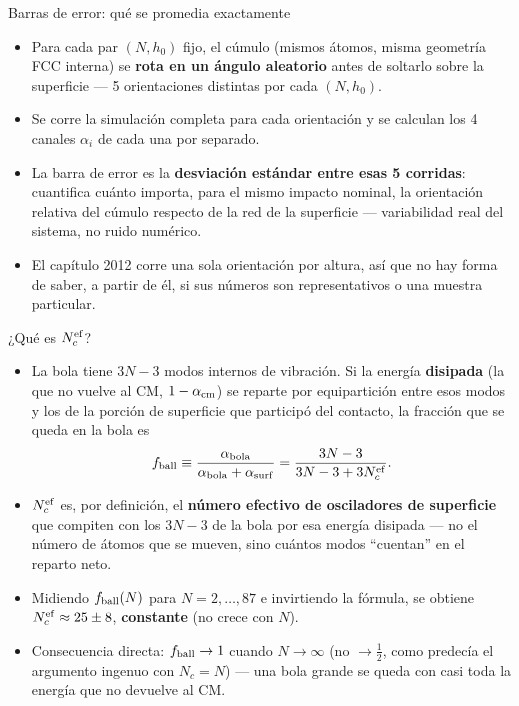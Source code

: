 \documentclass[11pt,aspectratio=169]{beamer}
\begin{document}
\begin{frame}{Barras de error: qué se promedia exactamente}
\begin{itemize}
    \item Para cada par $(N,h_0)$ fijo, el cúmulo (mismos átomos, misma
    geometría FCC interna) se \textbf{rota en un ángulo aleatorio} antes
    de soltarlo sobre la superficie --- 5 orientaciones distintas por
    cada $(N,h_0)$.
    \item Se corre la simulación completa para cada orientación y se
    calculan los 4 canales $\alpha_i$ de cada una por separado.
    \item La barra de error es la \textbf{desviación estándar entre esas
    5 corridas}: cuantifica cuánto importa, para el mismo impacto
    nominal, la orientación relativa del cúmulo respecto de la red de la
    superficie --- variabilidad real del sistema, no ruido numérico.
    \item El capítulo 2012 corre una sola orientación por altura, así que
    no hay forma de saber, a partir de él, si sus números son
    representativos o una muestra particular.
\end{itemize}
\end{frame}

\begin{frame}{¿Qué es \texorpdfstring{$N_c^{\rm ef}$}{Nc\_ef}?}
\begin{itemize}
    \item La bola tiene $3N-3$ modos internos de vibración. Si la energía
    \textbf{disipada} (la que no vuelve al CM, $1-\alpha_{\rm cm}$) se
    reparte por equipartición entre esos modos y los de la porción de
    superficie que participó del contacto, la fracción que se queda en la
    bola es
    \[
    f_{\rm ball}\equiv\frac{\alpha_{\rm bola}}{\alpha_{\rm bola}+\alpha_{\rm surf}}
    =\frac{3N-3}{3N-3+3N_c^{\rm ef}}.
    \]
    \item $N_c^{\rm ef}$ es, por definición, el \textbf{número efectivo de
    osciladores de superficie} que compiten con los $3N-3$ de la bola por
    esa energía disipada --- no el número de átomos que se mueven, sino
    cuántos modos ``cuentan'' en el reparto neto.
    \item Midiendo $f_{\rm ball}(N)$ para $N=2,\ldots,87$ e invirtiendo la
    fórmula, se obtiene $N_c^{\rm ef}\approx25\pm8$, \textbf{constante}
    (no crece con $N$).
    \item Consecuencia directa: $f_{\rm ball}\to1$ cuando $N\to\infty$
    (no $\to\tfrac12$, como predecía el argumento ingenuo con
    $N_c=N$) --- una bola grande se queda con casi toda la energía que no
    devuelve al CM.
\end{itemize}
\end{frame}
\end{document}
